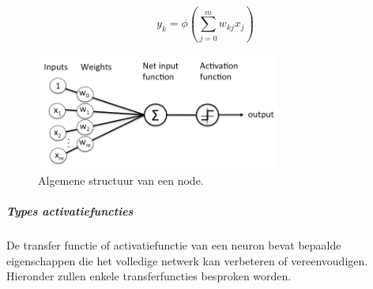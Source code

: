 			\begin{equation}
				y_k = \phi \left( \sum_{j=0}^{m}w_{kj}x_j\right) 
			\end{equation}
			
			\begin{figure}
				\centering
				\includegraphics[width=80mm]{afbeeldingen/Artificial_neuron2.PNG}
				\caption{Algemene structuur van een node\cite{bron:nnnode2}.}
				\label{fig:artificial_neuron}
			\end{figure}
			
			\subparagraph{Types activatiefuncties}
			De transfer functie of activatiefunctie van een neuron bevat bepaalde eigenschappen die het volledige netwerk kan verbeteren of vereenvoudigen. Hieronder zullen enkele transferfuncties besproken worden.
			
